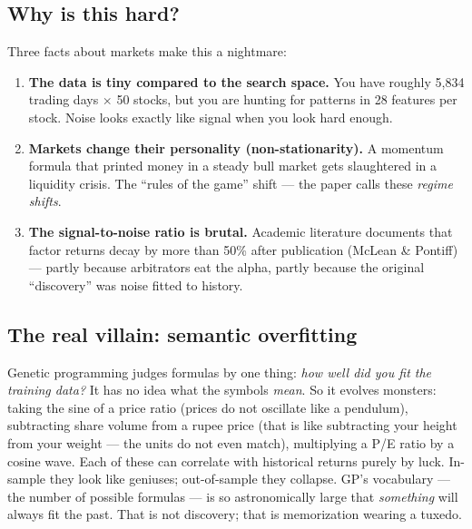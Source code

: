 \documentclass[11pt,a4paper]{article}
\begin{document}
\subsection{Why is this hard?}

Three facts about markets make this a nightmare:

\begin{enumerate}
  \item \textbf{The data is tiny compared to the search space.} You have roughly
  5{,}834 trading days $\times$ 50 stocks, but you are hunting for patterns in
  28 features per stock. Noise looks exactly like signal when you look hard
  enough.
  \item \textbf{Markets change their personality (non-stationarity).} A momentum
  formula that printed money in a steady bull market gets slaughtered in a
  liquidity crisis. The ``rules of the game'' shift --- the paper calls these
  \emph{regime shifts}.
  \item \textbf{The signal-to-noise ratio is brutal.} Academic literature
  documents that factor returns decay by more than 50\% after publication
  (McLean \& Pontiff) --- partly because arbitrators eat the alpha, partly
  because the original ``discovery'' was noise fitted to history.
\end{enumerate}

\subsection{The real villain: semantic overfitting}

\begin{plaineng}
Genetic programming judges formulas by one thing: \emph{how well did you fit
the training data?} It has no idea what the symbols \emph{mean}. So it evolves
monsters: taking the sine of a price ratio (prices do not oscillate like a
pendulum), subtracting share volume from a rupee price (that is like
subtracting your height from your weight --- the units do not even match),
multiplying a P/E ratio by a cosine wave. Each of these can correlate with
historical returns purely by luck. In-sample they look like geniuses;
out-of-sample they collapse. GP's vocabulary --- the number of possible
formulas --- is so astronomically large that \emph{something} will always fit
the past. That is not discovery; that is memorization wearing a tuxedo.
\end{plaineng}
\end{document}
